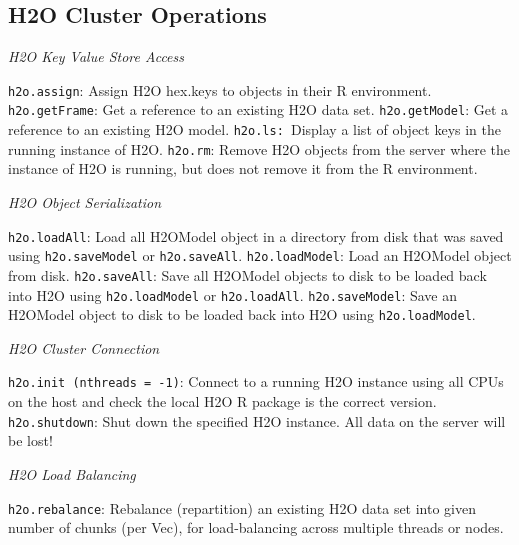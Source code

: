 {{{\subsection{H2O Cluster Operations}
\emph{H2O Key Value Store Access}\par
{\texttt{h2o.assign}}: Assign H2O hex.keys to objects in their R environment.\newline
{\texttt{h2o.getFrame}}: Get a reference to an existing H2O data set. \newline
{\texttt{h2o.getModel}}: Get a reference to an existing H2O model. \newline
{\texttt{h2o.ls: }}Display a list of object keys in the running instance of H2O. \newline
{\texttt{h2o.rm}}: Remove H2O objects from the server where the instance of H2O is running, but does not remove it from the R environment.\newline

\emph{H2O Object Serialization}\par
{\texttt{h2o.loadAll}}: Load all H2OModel object in a directory from disk that was saved using {\texttt{h2o.saveModel}} or {\texttt{h2o.saveAll}}.\newline %
{\texttt{h2o.loadModel}}: Load an H2OModel object from disk.\newline
{\texttt{h2o.saveAll}}: Save all H2OModel objects to disk to be loaded back into H2O using {\texttt{h2o.loadModel}} or {\texttt{h2o.loadAll}}.\newline %
{\texttt{h2o.saveModel}}: Save an H2OModel object to disk to be loaded back into H2O using {\texttt{h2o.loadModel}}.\newline

\emph{H2O Cluster Connection}\par
{\texttt{h2o.init (nthreads = -1)}}: Connect to a running H2O instance using all CPUs on the host and check the local H2O R package is the correct version.\newline
{\texttt{h2o.shutdown}}: Shut down the specified H2O instance. All data on the server will be lost!\newline

\emph{H2O Load Balancing}\par
{\texttt{h2o.rebalance}}: Rebalance (repartition) an existing H2O data set into given number of chunks (per Vec), for load-balancing across multiple threads or nodes.\newline %

}}}
